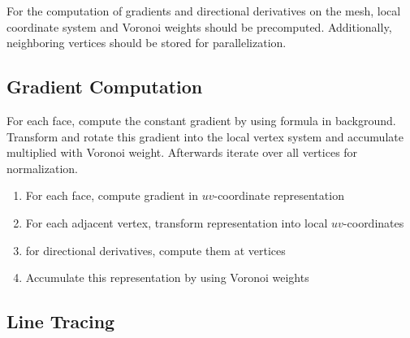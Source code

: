 \documentclass[9pt,fleqn,twoside,twocolumn]{stdglobal}
\begin{document}
    For the computation of gradients and directional derivatives on the mesh, local coordinate system and Voronoi weights should be precomputed.
    Additionally, neighboring vertices should be stored for parallelization.

  \subsection{Gradient Computation}
    For each face, compute the constant gradient by using formula in background.
    Transform and rotate this gradient into the local vertex system and accumulate multiplied with Voronoi weight.
    Afterwards iterate over all vertices for normalization.

    \begin{tcolorbox}[%
      colframe=black,
      colbacktitle=white,
      coltitle=black,
      colback=mathdefback,
      attach boxed title to top center={yshift=-2mm},
      enhanced,
      titlerule=0.1pt,
      boxrule=0.5pt,
      arc=5pt,
      breakable,
      width=\linewidth,
      title=Gradient Algorithm
    ]
      \begin{enumerate}
        \item For each face, compute gradient in $uv$-coordinate representation
        \item For each adjacent vertex, transform representation into local $uv$-coordinates
        \item for directional derivatives, compute them at vertices
        \item Accumulate this representation by using Voronoi weights
      \end{enumerate}
    \end{tcolorbox}

  \subsection{Line Tracing}
\end{document}
